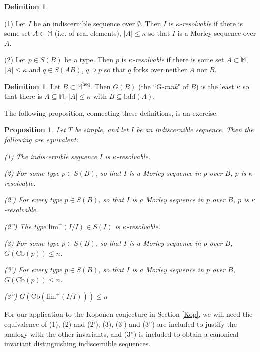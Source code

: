 \documentclass[11pt]{amsart}
\newtheorem{prop}[theorem]{Proposition}
\theoremstyle{definition}
\newtheorem{definition}[theorem]{Definition}
\theoremstyle{remark}
\numberwithin{equation}{section}
\begin{document}
\begin{definition}
   \label{resolvable}
    
    (1) Let $I$ be an indiscernible sequence over $\emptyset$. Then $I$ is \emph{$\kappa$-resolvable} if there is some set $A \subset \mathbb{M}$ (i.e. of real elements), $|A| \leq \kappa$ so that $I$ is a Morley sequence over $A$.
   
    (2) Let $p \in S(B)$ be a type. Then $p$ is \emph{$\kappa$-resolvable} if there is some set $A \subset \mathbb{M}$, $|A| \leq \kappa$ and $ q \in S(AB)$, $q \supseteq p$ so that $q$ forks over neither $A$ nor $B$.

    
\end{definition}

\begin{definition}\label{grank}
    Let $ B \subset \mathbb{M}^{\mathrm{heq}} $. Then $G(B)$ (the ``\emph{$\mathrm{G}$-rank}" of $B$) is the least $\kappa$ so that there is $A \subseteq \mathbb{M}$, $|A| \leq \kappa$ with $B \subseteq \mathrm{bdd}(A)$.
\end{definition}

The following proposition, connecting these definitions, is an exercise:

\begin{prop}\label{resolvabilitygrank}
    Let $T$ be simple, and let $I$ be an indiscernible sequence. Then the following are equivalent:

    (1) The indiscernible sequence $I$ is $\kappa$-resolvable.

    (2) For some type $p \in S(B)$, so that $I$ is a Morley sequence in $p$ over $B$, $p$ is $\kappa$-resolvable.

    (2') For every type $p \in S(B)$, so that $I$ is a Morley sequence in $p$ over $B$, $p$ is $\kappa$-resolvable.

    (2'') The type $\mathrm{lim}^{+}(I/I) \in S(I)$ is $\kappa$-resolvable.

    (3) For some type $p \in S(B)$, so that $I$ is a Morley sequence in $p$ over $B$, $G(\mathrm{Cb}(p)) \leq n$.


    (3') For every type $p \in S(B)$, so that $I$ is a Morley sequence in $p$ over $B$, $G(\mathrm{Cb}(p)) \leq n$.


    (3'') $G(\mathrm{Cb}(\mathrm{lim}^{+}(I/I))) \leq n$

    
\end{prop}

For our application to the Koponen conjecture in Section \ref{Kop}, we will need the equivalence of (1), (2) and (2'); (3), (3') and (3'') are included to justify the analogy with the other invariants, and (3'') is included to obtain a canonical invariant distinguishing indiscernible sequences.
\end{document}
